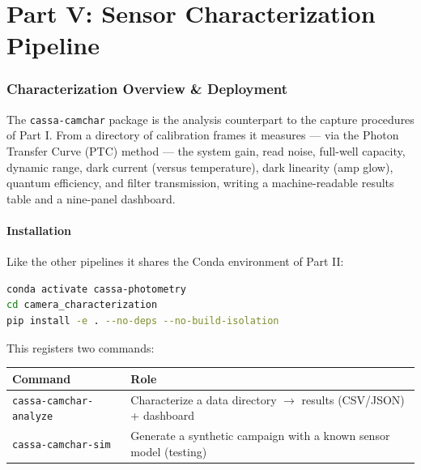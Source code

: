 \documentclass[11pt,a4paper]{article}
\begin{document}
\newpage

\part*{Part V: Sensor Characterization Pipeline}

\section{Characterization Overview \& Deployment}
The \texttt{cassa-camchar} package is the analysis counterpart to the capture procedures of Part I. From a directory of calibration frames it measures --- via the Photon Transfer Curve (PTC) method --- the system gain, read noise, full-well capacity, dynamic range, dark current (versus temperature), dark linearity (amp glow), quantum efficiency, and filter transmission, writing a machine-readable results table and a nine-panel dashboard.

\subsection{Installation}
Like the other pipelines it shares the Conda environment of Part II:
\begin{lstlisting}[language=bash]
conda activate cassa-photometry
cd camera_characterization
pip install -e . --no-deps --no-build-isolation
\end{lstlisting}
This registers two commands:
\begin{center}
\begin{tabularx}{\textwidth}{|l|X|}
\hline
\textbf{Command} & \textbf{Role} \\
\hline
\texttt{cassa-camchar-analyze} & Characterize a data directory $\rightarrow$ results (CSV/JSON) + dashboard \\
\hline
\texttt{cassa-camchar-sim} & Generate a synthetic campaign with a known sensor model (testing) \\
\hline
\end{tabularx}
\end{center}
\end{document}
